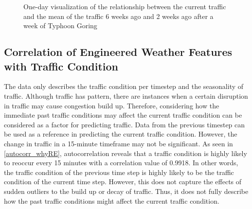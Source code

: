 \begin{figure}[h] 
\centering
  \centering
  \caption{One-day visualization of the relationship between the current traffic and the mean of the traffic 6 weeks ago and 2 weeks ago after a week of Typhoon Goring}
  \label{figure_traffic_mean_2weeks_vs_6weeks_disrupted}
\end{figure}



\subsection{Correlation of Engineered Weather Features with Traffic Condition}

The data only describes the traffic condition per timestep and the seasonality of traffic. Although traffic has pattern, there are instances when a certain disruption in traffic may cause congestion build up. Therefore, considering how the immediate past traffic conditions may affect the current traffic condition can be considered as a factor for predicting traffic. Data  from the previous timestep can be used as a reference in predicting the current traffic condition. However, the change in traffic in a 15-minute timeframe may not be significant. As seen in \ref{autocorr_whyRE}, autocorrelation reveals that a traffic condition is highly likely to reoccur every 15 minutes with a correlation value of 0.9918. In other words, the traffic condition of the previous time step is highly likely to be the traffic condition of the current time step. However, this does not capture the effects of sudden outliers to the build up or decay of traffic. Thus, it does not fully describe how the past traffic conditions might affect the current traffic condition. 


